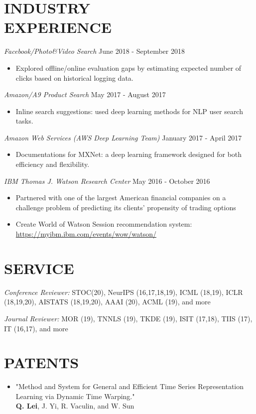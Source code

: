 \documentclass[margin, 10pt]{res} %
\begin{document}
\begin{resume}
\section{INDUSTRY\\EXPERIENCE}
{\sl Facebook/Photo\&Video Search} \hfill June 2018 - September 2018
\begin{itemize}
  \item Explored offline/online evaluation gaps by estimating expected number of 
    clicks based on historical logging data.
\end{itemize}
{\sl Amazon/A9 Product Search} \hfill May 2017 - August 2017
\begin{itemize}
  \item Inline search suggestions: used deep learning methods for NLP user 
    search tasks.
\end{itemize}
{\sl Amazon Web Services (AWS Deep Learning Team)} \hfill January 2017 - April 2017
\begin{itemize}
  \item Documentations for MXNet: a deep learning framework designed for 
    both efficiency and flexibility.
  \end{itemize}
{\sl IBM Thomas J. Watson Research Center} \hfill May 2016 - October 2016
\begin{itemize}
\item  %
  Partnered with one of the largest American financial companies on a challenge problem of predicting its clients' propensity of trading options
\item Create World of Watson Session recommendation system:\\
  \url{https://myibm.ibm.com/events/wow/watson/}
\end{itemize} 


\section{SERVICE}
{\sl Conference Reviewer:} STOC(20), NeurIPS (16,17,18,19), ICML (18,19), ICLR (18,19,20), 
AISTATS (18,19,20), AAAI (20), ACML (19), and more

{\sl Journal Reviewer:} MOR (19), TNNLS (19), TKDE (19), ISIT (17,18), TIIS (17), 
IT (16,17), and more

\section{PATENTS}\begin{itemize}
 \item{"Method and System for General and Efficient Time Series Representation 
     Learning via Dynamic Time Warping."\\
   \textbf{Q. Lei}, J. Yi, R. Vaculin, and W. Sun}


\end{itemize}
\end{resume}
\end{document}
